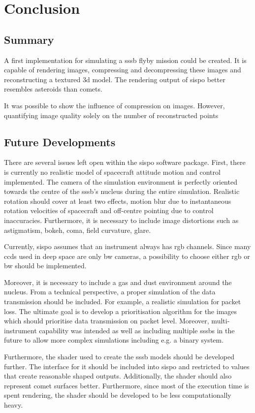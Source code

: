 \section{Conclusion} \label{sec:conclusion}
\subsection{Summary}
A first implementation for simulating a \gls{sssb} flyby mission could be created. It is capable of rendering images, compressing and decompressing these images and reconstructing a textured \gls{3d} model.
The rendering output of \gls{sispo} better resembles asteroids than comets.

It was possible to show the influence of compression on images. However, quantifying image quality solely on the number of reconstructed points

\subsection{Future Developments}
There are several issues left open within the \gls{sispo} software package. First, there is currently no realistic model of spacecraft attitude motion and control implemented. The camera of the simulation environment is perfectly oriented towards the centre of the \gls{sssb}'s nucleus during the entire simulation. Realistic rotation should cover at least two effects, motion blur due to instantaneous rotation velocities of spacecraft and off-centre pointing due to control inaccuracies. Furthermore, it is necessary to include  image distortions such as astigmatism, bokeh, coma, field curvature, glare.

Currently, \gls{sispo} assumes that an instrument always has \gls{rgb} channels. Since many \gls{ccd}s used in deep space are only \gls{bw} cameras, a possibility to choose either \gls{rgb} or \gls{bw} should be implemented.

Moreover, it is necessary to include a gas and dust environment around the nucleus. From a technical perspective, a proper simulation of the data transmission should be included. For example, a realistic simulation for packet loss. The ultimate goal is to develop a prioritisation algorithm for the images which should prioritise data transmission on packet level.
Moreover, multi-instrument capability was intended as well as including multiple \gls{sssb}s in the future to allow more complex simulations including e.g. a binary system.

Furthermore, the shader used to create the \gls{sssb} models should be developed further. The interface for it should be included into \gls{sispo} and restricted to values that create reasonable shaped outputs. Additionally, the shader should also represent comet surfaces better. Furthermore, since most of the execution time is spent rendering, the shader should be developed to be less computationally heavy.

